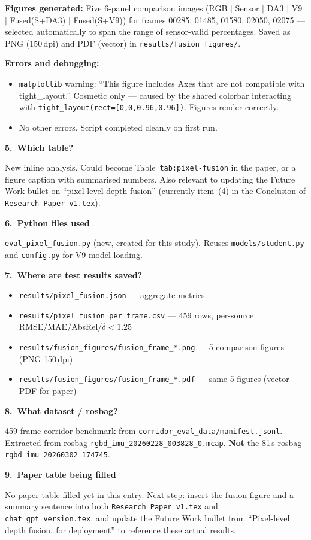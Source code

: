 \documentclass[11pt,a4paper]{article}
\begin{document}
\textbf{Figures generated:}  Five 6-panel comparison images
(RGB $|$ Sensor $|$ DA3 $|$ V9 $|$ Fused(S+DA3) $|$ Fused(S+V9))
for frames 00285, 01485, 01580, 02050, 02075 --- selected
automatically to span the range of sensor-valid percentages.
Saved as PNG (150\,dpi) and PDF (vector) in
\texttt{results/fusion\_figures/}.

\textbf{Errors and debugging:}
\begin{itemize}
  \item \texttt{matplotlib} warning: ``This figure includes Axes that
    are not compatible with tight\_layout.''  Cosmetic only --- caused
    by the shared colorbar interacting with
    \texttt{tight\_layout(rect=[0,0,0.96,0.96])}.  Figures render
    correctly.
  \item No other errors.  Script completed cleanly on first run.
\end{itemize}

\textbf{5.\ Which table?}

New inline analysis.  Could become Table~\texttt{tab:pixel-fusion}
in the paper, or a figure caption with summarised numbers.
Also relevant to updating the Future Work bullet on ``pixel-level
depth fusion'' (currently item~(4) in the Conclusion of
\texttt{Research Paper v1.tex}).

\textbf{6.\ Python files used}

\texttt{eval\_pixel\_fusion.py} (new, created for this study).
Reuses \texttt{models/student.py} and \texttt{config.py} for V9
model loading.

\textbf{7.\ Where are test results saved?}

\begin{itemize}
  \item \texttt{results/pixel\_fusion.json} --- aggregate metrics
  \item \texttt{results/pixel\_fusion\_per\_frame.csv} --- 459 rows,
    per-source RMSE/MAE/AbsRel/$\delta{<}1.25$
  \item \texttt{results/fusion\_figures/fusion\_frame\_*.png} ---
    5 comparison figures (PNG 150\,dpi)
  \item \texttt{results/fusion\_figures/fusion\_frame\_*.pdf} ---
    same 5 figures (vector PDF for paper)
\end{itemize}

\textbf{8.\ What dataset / rosbag?}

459-frame corridor benchmark from
\texttt{corridor\_eval\_data/manifest.jsonl}.  Extracted from rosbag
\texttt{rgbd\_imu\_20260228\_003828\_0.mcap}.  \textbf{Not} the 81\,s
rosbag \texttt{rgbd\_imu\_20260302\_174745}.

\textbf{9.\ Paper table being filled}

No paper table filled yet in this entry.  Next step: insert the fusion
figure and a summary sentence into both \texttt{Research Paper v1.tex}
and \texttt{chat\_gpt\_version.tex}, and update the Future Work
bullet from ``Pixel-level depth fusion\ldots for deployment'' to
reference these actual results.
\end{document}
